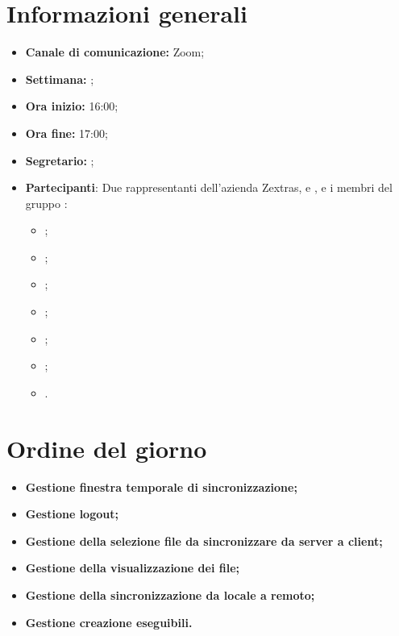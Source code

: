 \section{Informazioni generali}

\begin{itemize}

    \item \textbf{Canale di comunicazione:} Zoom;

    \item \textbf{Settimana:} \DataMeeting{};
    
    
    \item \textbf{Ora inizio:} 16:00;

    \item \textbf{Ora fine:} 17:00;

    \item \textbf{Segretario:} \ACapoRedazione{};

    \item \textbf{Partecipanti}: Due rappresentanti dell'azienda Zextras, \textit{\Alessio{}} e \textit{\Federico{}}, e i membri del gruppo \Gruppo{}:
        \begin{itemize}
            \item \Daniele{};
            \item \Davide{};
            \item \Francesco{};
            \item \Tommaso{};
            \item \Lucrezia{};
            \item \Matteo{};
            \item \Giosue{}.
        \end{itemize}
\end{itemize}

\section{Ordine del giorno}

\begin{itemize}
    \item\textbf{Gestione finestra temporale di sincronizzazione;}
    \item\textbf{Gestione logout;}
    \item\textbf{Gestione della selezione file da sincronizzare da server a client;}
        \item\textbf{Gestione della visualizzazione dei file;}
    \item\textbf{Gestione della sincronizzazione da locale a remoto;}
    \item\textbf{Gestione creazione eseguibili.}
\end{itemize}
\newpage


